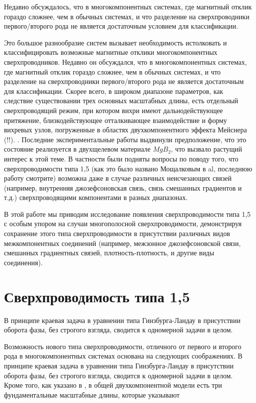 Недавно обсуждалось, что в многокомпонентных системах, где магнитный отклик 
гораздо сложнее, чем в обычных системах, и что разделение на сверхпроводники 
первого/второго рода не является достаточным условием для классификации.

Это большое разнообразие систем вызывает необходимость истолковать и 
классифицировать возможные магнитные отклики многокомпонентных 
сверхпроводников. Недавно он обсуждался, что в многокомпонентных системах, 
где магнитный отклик гораздо сложнее, чем в обычных системах, и что разделение 
на сверхпроводники первого/второго рода не является достаточным для 
классификации. Скорее всего, в широком диапазоне параметров, как следствие 
существовании трех основных масштабных длины, есть отдельный сверхпроводящий 
режим, при котором вихри имеют дальнодействующее притяжение, близкодействующее 
отталкивающее взаимодействие и форму вихревых узлов, погруженные в областях 
двухкомпонентного эффекта Мейснера (!!). \cite{bib:1,bib:2}. Последние 
экспериментальные работы \cite{bib:16,bib:17} выдвинули предположение, что 
это состояние реализуется в двухщелевом материале \( MgB_2 \), что вызвало 
растущий интерес к этой теме. В частности были подняты вопросы по поводу того, 
что сверхпроводимости типа 1,5 (как это было названо Мощалковым в 
al\cite{bib:16}, последнюю работу смотрите\cite{bib:18}) возможна даже в 
случае различных неисчезающих связей (например, внутренняя джозефсоновская 
связь, связь смешанных градиентов и т.д.) сверхпроводящими компонентами в 
разных диапазонах.

В этой работе мы приводим исследование появления сверхпроводимости типа 1,5 с 
особым упором на случаи многополосной сверхпроводимости, демонстрируя 
сохранение этого типа сверхпроводимости в присутствии различных видов 
межкомпонентных соединений (например, межзонное джозефсоновской связи, 
смешанных градиентных связей, плотность-плотность, и другие виды соединения).

\section{Сверхпроводимость типа 1,5}
\label{sec:1-1}

В принципе краевая задача в уравнении типа Гинзбурга-Ландау в присутствии 
оборота фазы, без строгого взгляда, сводится к одномерной задачи в целом.

Возможность нового типа сверхпроводимости, отличного от первого и второго рода 
в многокомпонентных системах \cite{bib:1,bib:2} основана на следующих 
соображениях. В принципе краевая задача в уравнении типа Гинзбурга-Ландау в 
присутствии оборота фазы, без строгого взгляда, сводится к одномерной задачи 
в целом. Кроме того, как указано в \cite{bib:1,bib:2}, в общей 
двухкомпонентной модели есть три фундаментальные масштабные длины, которые 
указывают

